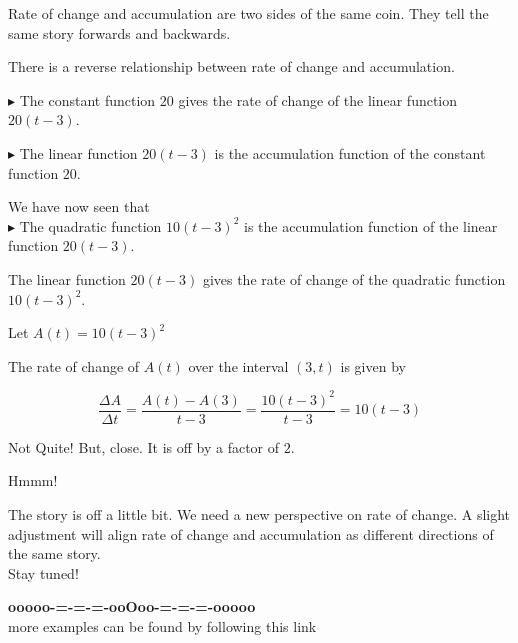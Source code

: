 \documentclass{ximera}
\begin{document}
Rate of change and accumulation are two sides of the same coin.  They tell the same story forwards and backwards.



There is a reverse relationship between rate of change and accumulation.


$\blacktriangleright$ The constant function $20$ gives the rate of change of the linear function $20(t-3)$.


$\blacktriangleright$ The linear function $20(t-3)$ is the accumulation function of the constant function $20$.




We have now seen that \\

$\blacktriangleright$ The quadratic function $10(t-3)^2$ is the accumulation function of the linear function $20(t-3)$. \\





\begin{idea}


The linear function $20(t-3)$ gives the rate of change of the quadratic function $10(t-3)^2$.





Let $A(t) = 10 (t-3)^2$


The rate of change of $A(t)$ over the interval $(3, t)$ is given by




\[
\frac{\Delta A}{\Delta t} = \frac{A(t) - A(3)}{t-3} = \frac{10 (t-3)^2}{t-3} = 10(t-3)
\]


Not Quite!  But, close.  It is off by a factor of $2$.  




Hmmm!

\end{idea}














The story is off a little bit. We need a new perspective on rate of change.  A slight adjustment will align rate of change and accumulation as different directions of the same story. \\

Stay tuned!







\begin{onlineOnly}
\begin{center}
\textbf{\textcolor{green!50!black}{ooooo-=-=-=-ooOoo-=-=-=-ooooo}} \\

more examples can be found by following this link\\ 

\end{center}
\end{onlineOnly}
\end{document}
